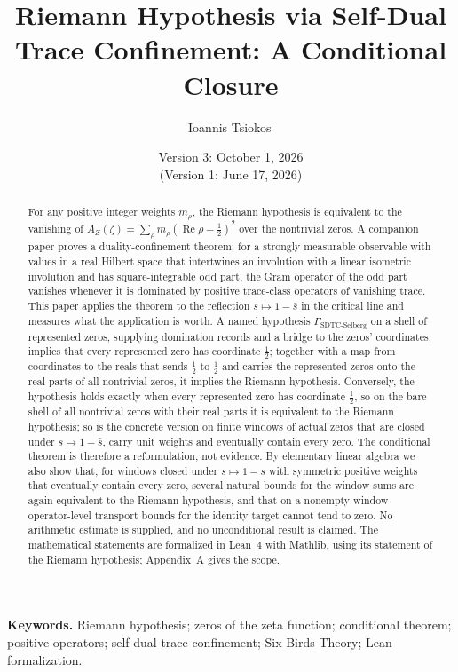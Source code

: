 \documentclass[11pt]{article}
\title{Riemann Hypothesis via Self-Dual Trace Confinement: A Conditional Closure}
\author{Ioannis Tsiokos\,\orcidlink{0009-0009-7659-5964}}
\date{Version 3: October 1, 2026\\[2pt] \footnotesize (Version 1: June 17, 2026)}
\DeclareMathOperator{\Real}{Re}
\newcommand{\AZ}{A_{Z}(\zeta)}
\newcommand{\GamSDTCSelberg}{\Gamma_{\mathrm{SDTC\text{-}Selberg}}}
\theoremstyle{definition}
\begin{document}
\maketitle
\thispagestyle{firstpage}

\begin{abstract}
For any positive integer weights \(m_\rho\), the Riemann hypothesis is
equivalent to the vanishing of \(\AZ=\sum_\rho m_\rho(\Real\rho-\frac12)^2\)
over the nontrivial zeros.  A companion paper proves a
duality-confinement theorem: for a strongly measurable observable with
values in a real Hilbert space that intertwines an involution with a
linear isometric involution and has square-integrable odd part, the
Gram operator of the odd part vanishes whenever it is dominated by
positive trace-class operators of vanishing trace.  This paper applies
the theorem to the reflection \(s\mapsto1-\bar s\) in the critical line
and measures what the application is worth.  A named hypothesis
\(\GamSDTCSelberg\) on a shell of represented zeros, supplying
domination records and a bridge to the zeros' coordinates, implies that
every represented zero has coordinate \(\frac12\); together with a map
from coordinates to the reals that sends \(\frac12\) to \(\frac12\) and
carries the represented zeros onto the real parts of all nontrivial
zeros, it implies the Riemann hypothesis.  Conversely, the hypothesis
holds exactly when every represented zero has coordinate \(\frac12\), so
on the bare shell of all nontrivial zeros with their real parts it is
equivalent to the Riemann hypothesis; so is the concrete version on
finite windows of actual zeros that are closed under
\(s\mapsto1-\bar s\), carry unit weights and eventually contain every
zero.  The conditional theorem is therefore a reformulation, not
evidence.  By elementary linear algebra we also show that, for windows
closed under \(s\mapsto1-s\) with symmetric positive weights that
eventually contain every zero, several natural bounds for the window
sums are again equivalent to the Riemann hypothesis, and that on a
nonempty window operator-level transport bounds for the identity
target cannot tend to zero.  No arithmetic estimate is supplied, and no
unconditional result is claimed.  The mathematical statements are
formalized in Lean~4 with Mathlib, using its statement of the Riemann
hypothesis; Appendix~A gives the scope.
\end{abstract}

\medskip
\noindent\textbf{Keywords.} Riemann hypothesis; zeros of the zeta function; conditional theorem; positive operators; self-dual trace confinement; Six Birds Theory; Lean formalization.
\end{document}

